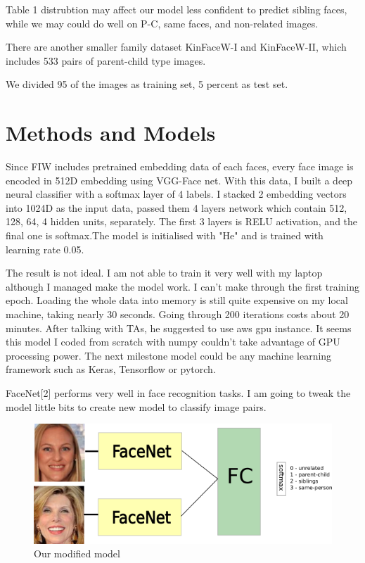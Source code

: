\documentclass{article}
\begin{document}
Table 1 distrubtion may affect our model less confident to predict sibling
faces, while we may could do well on P-C, same faces, and non-related images.

There are another smaller family dataset KinFaceW-I and KinFaceW-II, which
includes 533 pairs of parent-child type images.

We divided 95 of the images as training set, 5 percent as test set.

\section{Methods and Models}

Since FIW includes pretrained embedding data of each faces, every face image is
encoded in 512D embedding using VGG-Face net. With this data, I built a deep
neural classifier with a softmax layer of 4 labels. I stacked 2 embedding
vectors into 1024D as the input data, passed them 4 layers network which
contain 512, 128, 64, 4 hidden units, separately. The first 3 layers is RELU
activation, and the final one is softmax.The model is initialised with "He" and
is trained with learning rate 0.05.

The result is not ideal. I am not able to train it very well with my laptop
although I managed make the model work. I can't make through the first training
epoch. Loading the whole data into memory is still quite expensive on my local
machine, taking nearly 30 seconds. Going through 200 iterations costs about 20
minutes. After talking with TAs, he suggested to use aws gpu instance. It seems
this model I coded from scratch with numpy couldn't take advantage of GPU
processing power. The next milestone model could be any machine learning
framework such as Keras, Tensorflow or pytorch.

FaceNet[2] performs very well in face recognition tasks. I am going to tweak the
model little bits to create new model to classify image pairs.

\begin{figure}[h]
	\caption{Our modified model}
	\includegraphics[width=1\textwidth]{img/model_pic}
\end{figure}
\end{document}
